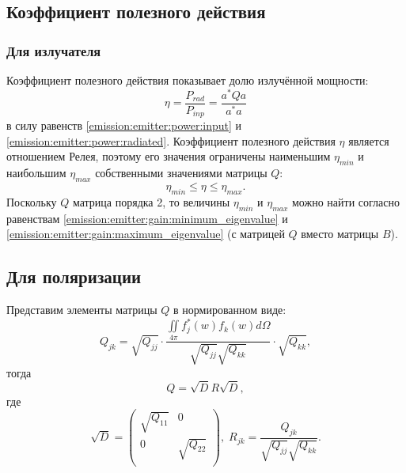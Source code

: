 \subsection{Коэффициент полезного действия}

\subsubsection{Для излучателя}

Коэффициент полезного действия показывает долю излучённой мощности:
\[
    \eta
    = \frac{P_{rad}}{P_{inp}}
    = \frac{a^* Q a}{a^* a}
\]
в силу равенств \eqref{emission:emitter:power:input} и \eqref{emission:emitter:power:radiated}. Коэффициент полезного действия $\eta$ является отношением Релея,
поэтому его значения ограничены наименьшим $\eta_{min}$ и наибольшим $\eta_{max}$ собственными значениями матрицы $Q$:
\[
    \eta_{min} \le \eta \le \eta_{max} .
\]
Поскольку $Q$ матрица порядка 2, то величины $\eta_{min}$ и $\eta_{max}$ можно найти согласно равенствам \eqref{emission:emitter:gain:minimum_eigenvalue} и
\eqref{emission:emitter:gain:maximum_eigenvalue} (с матрицей $Q$ вместо матрицы $B$).

\subsection{Для поляризации}

Представим элементы матрицы $Q$ в нормированном виде:
\[
    Q_{jk}
    =
    \sqrt{Q_{jj}}
    \cdot
    \frac{\iint \limits_{4 \pi} f_j^*(w) f_k(w) d \Omega}{\sqrt{Q_{jj}} \sqrt{Q_{kk}}}
    \cdot
    \sqrt{Q_{kk}} ,
\]
тогда
\[
    Q = \sqrt{D} R \sqrt{D} ,
\]
где
\[
    \sqrt{D}
    = \begin{pmatrix}
          \sqrt{Q_{11}} & 0             \\
          0             & \sqrt{Q_{22}} \\
    \end{pmatrix} ,
    \;
    R_{jk} = \frac{Q_{jk}}{\sqrt{Q_{jj}} \sqrt{Q_{kk}}} .
\]

